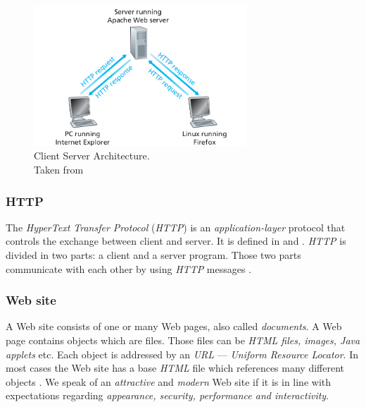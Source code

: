 \documentclass[
  a4paper,               %
  twoside,               %
  headings=small,        %
  DIV=12,                %
  BCOR=1cm,              %
  headinclude=true,      %
  footinclude=true,      %
  numbers=noenddot,      %
  11pt]{scrartcl}        %
\begin{document}
\begin{figure}[h]
  \centerline{\includegraphics[width=8cm]{pics/client_server.png}}
  \caption{Client Server Architecture.\\Taken from \cite{kurose}}
\end{figure}

\subsubsection{HTTP}
The \emph{HyperText Transfer Protocol} (\textit{HTTP}) is an \textit{application-layer} protocol that controls the exchange between client and server. It is defined in \cite{rfc1945} and \cite{rfc2616}. \textit{HTTP} is divided in two parts: a client and a server program. Those two parts communicate with each other by using \textit{HTTP} messages \cite{kurose}. 

\subsubsection{Web site}
A Web site consists of one or many Web pages, also called \textit{documents}. A Web page contains objects which are files. Those files can be \textit{HTML files, images, Java applets} etc. Each object is addressed by an \emph{URL} --- \emph{Uniform Resource Locator}. In most cases the Web site has a base \textit{HTML} file which references many different objects \cite{kurose}. We speak of an \textit{attractive} and \textit{modern} Web site if it is in line with expectations regarding \textit{appearance, security, performance and interactivity}. 
\end{document}
